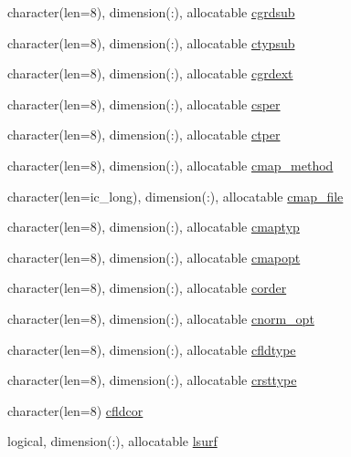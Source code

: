 \begin{DoxyCompactItemize}
\item 
character(len=8), dimension(\+:), allocatable \hyperlink{namespacemod__oasis__namcouple_ac7f3cff3406912fe6e48c3cc7cf5436b}{cgrdsub}
\item 
character(len=8), dimension(\+:), allocatable \hyperlink{namespacemod__oasis__namcouple_ad8f8aca3a6fa885e4edf027b79a93305}{ctypsub}
\item 
character(len=8), dimension(\+:), allocatable \hyperlink{namespacemod__oasis__namcouple_a5db101d0bffaf6fbd5ae10d1d0069108}{cgrdext}
\item 
character(len=8), dimension(\+:), allocatable \hyperlink{namespacemod__oasis__namcouple_a348612422a03e478041ca5bdfd7201ae}{csper}
\item 
character(len=8), dimension(\+:), allocatable \hyperlink{namespacemod__oasis__namcouple_aa179b0a473551b48ef895497515d021c}{ctper}
\item 
character(len=8), dimension(\+:), allocatable \hyperlink{namespacemod__oasis__namcouple_ac8c1f0014f2c3cbe0cc4fcb09e54dde3}{cmap\+\_\+method}
\item 
character(len=ic\+\_\+long), dimension(\+:), allocatable \hyperlink{namespacemod__oasis__namcouple_a6dbd7bccbfa28b209a4bc58131f8cf11}{cmap\+\_\+file}
\item 
character(len=8), dimension(\+:), allocatable \hyperlink{namespacemod__oasis__namcouple_a82b32aa4c78713443daf65a3dfbc75dc}{cmaptyp}
\item 
character(len=8), dimension(\+:), allocatable \hyperlink{namespacemod__oasis__namcouple_a3d7b34ed13d4ad8f86bbab3ad9956b6b}{cmapopt}
\item 
character(len=8), dimension(\+:), allocatable \hyperlink{namespacemod__oasis__namcouple_a070f65b97986d1075f1deed9224cd89b}{corder}
\item 
character(len=8), dimension(\+:), allocatable \hyperlink{namespacemod__oasis__namcouple_a205e8ba5863c6bf6de5c8450fb060c7a}{cnorm\+\_\+opt}
\item 
character(len=8), dimension(\+:), allocatable \hyperlink{namespacemod__oasis__namcouple_af6d77b87036aa40faa1ae1ed1b2a0866}{cfldtype}
\item 
character(len=8), dimension(\+:), allocatable \hyperlink{namespacemod__oasis__namcouple_a7cbf27327f01748c4f87803ccff71b61}{crsttype}
\item 
character(len=8) \hyperlink{namespacemod__oasis__namcouple_a5e1d0d9b3d9f438102623d9643fbc704}{cfldcor}
\item 
logical, dimension(\+:), allocatable \hyperlink{namespacemod__oasis__namcouple_a902fe007f6c2505858bf72dbc64e43a2}{lsurf}

\end{DoxyCompactItemize}
